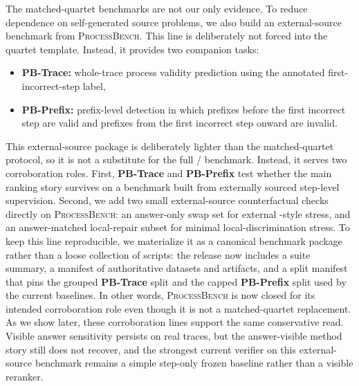 The matched-quartet benchmarks are not our only evidence. To reduce dependence
on self-generated source problems, we also build an external-source benchmark
from \textsc{ProcessBench}. This line is deliberately not forced into the
quartet template. Instead, it provides two companion tasks:
\begin{itemize}[leftmargin=1.5em]
\item \textbf{PB-Trace:} whole-trace process validity prediction using the
annotated first-incorrect-step label,
\item \textbf{PB-Prefix:} prefix-level detection in which prefixes before the
first incorrect step are valid and prefixes from the first incorrect step
onward are invalid.
\end{itemize}
This external-source package is deliberately lighter than the matched-quartet
protocol, so it is not a substitute for the full \amcd/\ass{} benchmark.
Instead, it serves two corroboration roles. First, \textbf{PB-Trace} and
\textbf{PB-Prefix} test whether the main ranking story survives on a benchmark
built from externally sourced step-level supervision. Second, we add two small
external-source counterfactual checks directly on \textsc{ProcessBench}: an
answer-only swap set for external \ass{}-style stress, and an answer-matched
local-repair subset for minimal local-discrimination stress.
To keep this line reproducible, we materialize it as a canonical benchmark
package rather than a loose collection of scripts: the release now includes a
suite summary, a manifest of authoritative datasets and artifacts, and a split
manifest that pins the grouped \textbf{PB-Trace} split and the capped
\textbf{PB-Prefix} split used by the current baselines. In other words,
\textsc{ProcessBench} is now closed for its intended corroboration role even
though it is not a matched-quartet replacement.
As we show later, these corroboration lines support the same conservative
read. Visible answer sensitivity persists on real traces, but the answer-visible
method story still does not recover, and the strongest current verifier on
this external-source benchmark remains a simple step-only frozen baseline
rather than a visible reranker.
